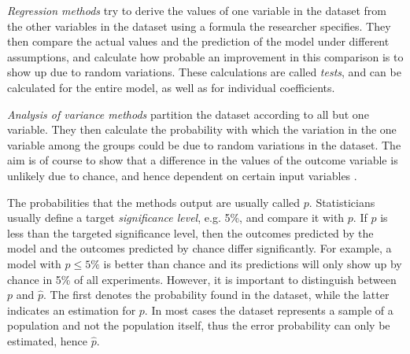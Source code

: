 \documentclass[a4paper,man,12pt,apacite,floatsintext]{apa6} %
\begin{document}
\emph{Regression methods} try to derive the values of
one variable in the dataset from the other variables in the dataset using a formula the
researcher specifies.
They then compare the actual values and the prediction of the model under
different assumptions, and calculate how probable an improvement in this
comparison is to show up due to random variations.
These calculations are called \emph{tests}, and can be calculated for the
entire model, as well as for individual coefficients. \cite{wpRA}

\emph{Analysis of variance methods} partition the dataset
according to all but one variable.
They then calculate the probability with
which the variation in the one variable among the groups could be due to
random variations in the dataset.
The aim is of course to show that a difference in the values of the outcome
variable is unlikely due to chance, and hence dependent on certain
input variables \cite{wpAOV}.

The probabilities that the methods output are usually called \(p\).
Statisticians usually define a target \emph{significance level},
e.g. 5\%, and compare it with \(p\).
If \(p\) is less than the targeted significance level, then
the outcomes predicted by the model and the outcomes predicted by chance
differ significantly.
For example, a model with \(p \le 5\%\) is better than chance and its
predictions will only show up by chance in 5\% of all experiments.
However, it is important to distinguish between \(p\) and \(\hat{p}\).
The first denotes the probability found in the dataset, while the latter
indicates an estimation for \(p\).
In most cases the dataset represents a sample of a population and not the
population itself, thus the error probability can only be estimated,
hence \(\hat{p}\).
\end{document}
